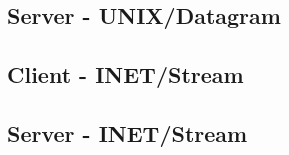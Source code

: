 \documentclass[openright,twoside]{report}
\begin{document}
\subsection{Server - UNIX/Datagram}
\label{s:ServerUNIXDatagram}



\subsection{Client - INET/Stream}
\label{s:ClientINETStream}



\subsection{Server - INET/Stream}
\label{s:ServerINETStream}







\end{document}
